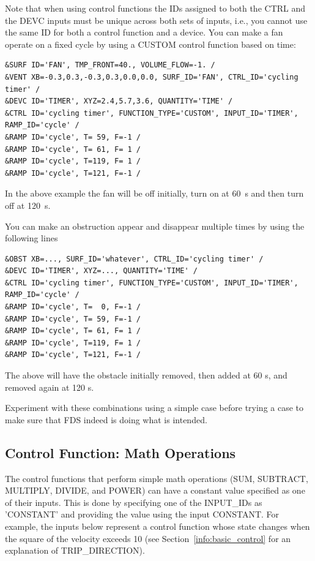 \documentclass[11pt]{book}
\begin{document}
Note that when using control functions the {\ct ID}s assigned to both the {\ct CTRL} and the {\ct DEVC} inputs must be unique across both sets of inputs, i.e., you cannot use the same {\ct ID} for both a control function and a device. You can make a fan operate on a fixed cycle by using a {\ct CUSTOM} control function based on time:
\begin{lstlisting}
&SURF ID='FAN', TMP_FRONT=40., VOLUME_FLOW=-1. /
&VENT XB=-0.3,0.3,-0.3,0.3,0.0,0.0, SURF_ID='FAN', CTRL_ID='cycling timer' /
&DEVC ID='TIMER', XYZ=2.4,5.7,3.6, QUANTITY='TIME' /
&CTRL ID='cycling timer', FUNCTION_TYPE='CUSTOM', INPUT_ID='TIMER', RAMP_ID='cycle' /
&RAMP ID='cycle', T= 59, F=-1 /
&RAMP ID='cycle', T= 61, F= 1 /
&RAMP ID='cycle', T=119, F= 1 /
&RAMP ID='cycle', T=121, F=-1 /
\end{lstlisting}
In the above example the fan will be off initially, turn on at 60~s and then turn off at 120~s.

You can make an obstruction appear and disappear multiple times by using the following lines
\begin{lstlisting}
&OBST XB=..., SURF_ID='whatever', CTRL_ID='cycling timer' /
&DEVC ID='TIMER', XYZ=..., QUANTITY='TIME' /
&CTRL ID='cycling timer', FUNCTION_TYPE='CUSTOM', INPUT_ID='TIMER', RAMP_ID='cycle' /
&RAMP ID='cycle', T=  0, F=-1 /
&RAMP ID='cycle', T= 59, F=-1 /
&RAMP ID='cycle', T= 61, F= 1 /
&RAMP ID='cycle', T=119, F= 1 /
&RAMP ID='cycle', T=121, F=-1 /
\end{lstlisting}
The above will have the obstacle initially removed, then added at 60 s, and removed again at 120 s.

Experiment with these combinations using a simple case before trying a case to make sure that FDS indeed is doing what is intended.

\subsection{Control Function: Math Operations }
\label{info:CONTROL_MATH}

The control functions that perform simple math operations ({\ct SUM},  {\ct SUBTRACT},  {\ct MULTIPLY},  {\ct DIVIDE}, and  {\ct POWER}) can have a constant value specified as one of their inputs.  This is done by specifying one of the {\ct INPUT\_ID}s as {\ct 'CONSTANT'} and providing the value using the input {\ct CONSTANT}. For example, the inputs below represent a control function whose state changes when the square of the velocity exceeds 10 (see Section~\ref{info:basic_control} for an explanation of {\ct TRIP\_DIRECTION}).
\end{document}

